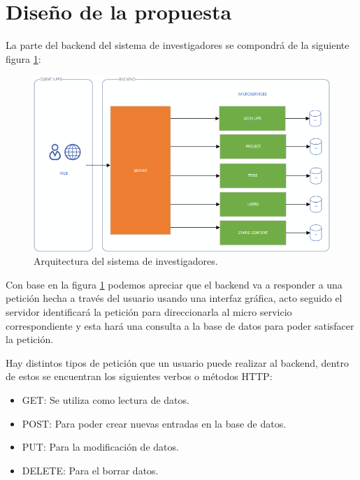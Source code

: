 
\section{Diseño de la propuesta}

    La parte del backend del sistema de investigadores se compondrá de la siguiente figura \ref{fig:architecture}:
    
    \begin{figure}[H]
        \centering
        \includegraphics[width=\textwidth]{Propuesta_Plantilla_Tesis_LaTeX_UAG/imagenes/ARCHITECTURE.png}
        \caption{Arquitectura del sistema de investigadores.}
        \label{fig:architecture}
    \end{figure}
    
    Con base en la figura \ref{fig:architecture} podemos apreciar que el backend va a responder a una petición hecha a través del usuario usando una interfaz gráfica, acto seguido el servidor identificará la petición para direccionarla al micro servicio correspondiente y esta hará una consulta a la base de datos para poder satisfacer la petición.
    
    Hay distintos tipos de petición que un usuario puede realizar al backend, dentro de estos se encuentran los siguientes verbos o métodos HTTP:
    
    \begin{itemize}
        \item GET: Se utiliza como lectura de datos.
        \item POST: Para poder crear nuevas entradas en la base de datos.
        \item PUT: Para la modificación de datos.
        \item DELETE: Para el borrar datos.
    \end{itemize}
    
